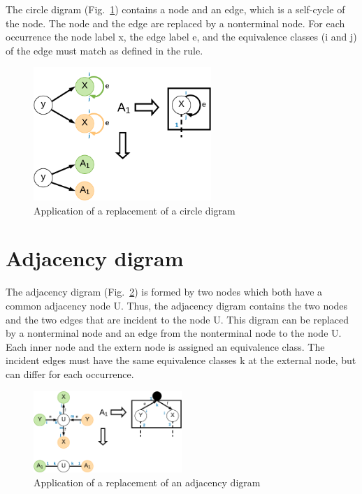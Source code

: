\documentclass[a4paper]{scrartcl}
\begin{document}
The circle digram (Fig.~\ref{fig:circleDigram}) contains a node and an edge, which is a self-cycle of the node. The node and the edge are replaced by a nonterminal node. For each occurrence the node label x, the edge label e, and the equivalence classes (i and j) of the edge must match as defined in the rule.

\begin{figure}[h]
	\centering
	\includegraphics[width=0.6\textwidth]{img/circleDigram}
	\caption{Application of a replacement of a circle digram}
	\label{fig:circleDigram}
\end{figure}



\section{Adjacency digram}
\label{sec:adjacencyDigram}



The adjacency digram (Fig.~\ref{fig:adjacencyDigram}) is formed by two nodes which both have a common adjacency node U. Thus, the adjacency digram contains the two nodes and the two edges that are incident to the node U. This digram can be replaced by a nonterminal node and an edge from the nonterminal node to the node U. Each inner node and the extern node is assigned an equivalence class.
The incident edges must have the same equivalence classes k at the external node, but can differ for each occurrence.

\begin{figure}[h]
	\centering
	\includegraphics[width=0.5\textwidth]{img/adjacencyDigram}
	\caption{Application of a replacement of an adjacency digram}
	\label{fig:adjacencyDigram}
\end{figure}
\end{document}
